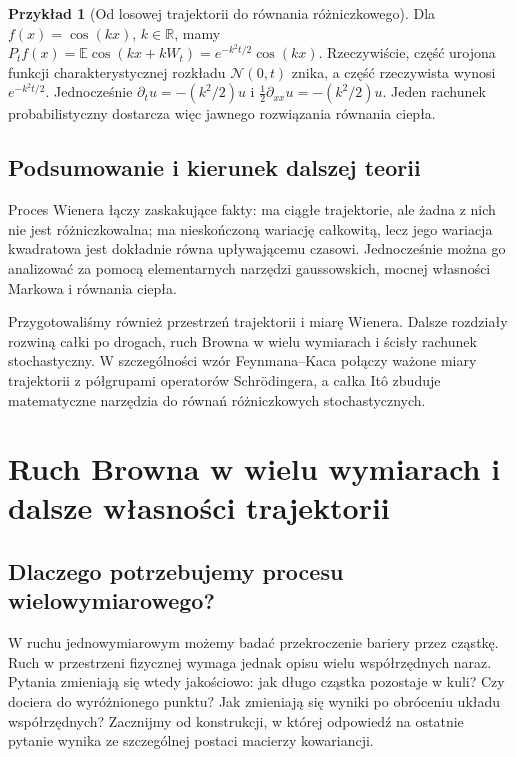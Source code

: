 \documentclass[11pt,a4paper,oneside]{report}
\numberwithin{equation}{chapter}
\theoremstyle{plain}
\theoremstyle{definition}
\newtheorem{przyklad}{Przykład}[chapter]
\theoremstyle{remark}
\newcommand{\R}{\mathbb{R}}
\newcommand{\E}{\mathbb{E}}
\newcommand{\Normal}{\mathcal{N}}
\begin{document}
\begin{przyklad}[Od losowej trajektorii do równania różniczkowego]
Dla $f(x)=\cos(kx)$, $k\in\R$, mamy
$P_tf(x)=\E\cos(kx+kW_t)
=e^{-k^2t/2}\cos(kx)$.
Rzeczywiście, część urojona funkcji charakterystycznej
rozkładu $\Normal(0,t)$ znika, a część rzeczywista
wynosi $e^{-k^2t/2}$. Jednocześnie
$\partial_tu=-(k^2/2)u$ i
$\frac12\partial_{xx}u=-(k^2/2)u$.
Jeden rachunek probabilistyczny dostarcza więc
jawnego rozwiązania równania ciepła.
\end{przyklad}

\section{Podsumowanie i kierunek dalszej teorii}
Proces Wienera łączy zaskakujące fakty: ma ciągłe
trajektorie, ale żadna z nich nie jest różniczkowalna;
ma nieskończoną wariację całkowitą, lecz jego wariacja
kwadratowa jest dokładnie równa upływającemu czasowi.
Jednocześnie można go analizować za pomocą elementarnych
narzędzi gaussowskich, mocnej własności Markowa i
równania ciepła.

Przygotowaliśmy również przestrzeń trajektorii i miarę Wienera.
Dalsze rozdziały rozwiną całki po drogach, ruch Browna
w wielu wymiarach i ścisły rachunek stochastyczny.
W szczególności wzór Feynmana--Kaca połączy
ważone miary trajektorii z półgrupami operatorów
Schrödingera, a całka Itô zbuduje matematyczne
narzędzia do równań różniczkowych stochastycznych.


\chapter{Ruch Browna w wielu wymiarach i dalsze własności trajektorii}
\label{ch:brown-multi}

\section{Dlaczego potrzebujemy procesu wielowymiarowego?}
W ruchu jednowymiarowym możemy badać przekroczenie bariery przez
cząstkę. Ruch w przestrzeni fizycznej wymaga jednak opisu wielu
współrzędnych naraz. Pytania zmieniają się wtedy jakościowo:
jak długo cząstka pozostaje w kuli? Czy dociera do wyróżnionego
punktu? Jak zmieniają się wyniki po obróceniu układu współrzędnych?
Zacznijmy od konstrukcji, w której odpowiedź na ostatnie pytanie
wynika ze szczególnej postaci macierzy kowariancji.
\end{document}

